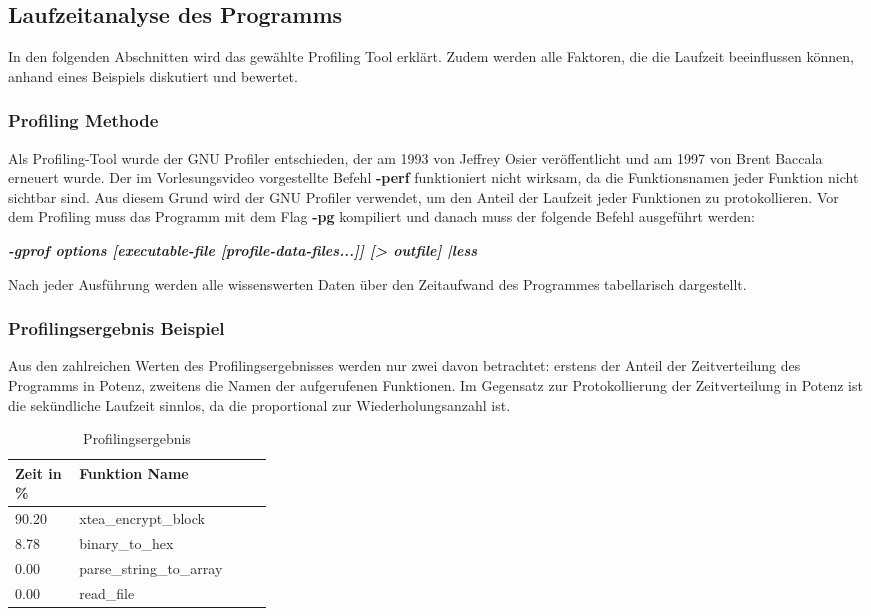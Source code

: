 \documentclass[course=erap]{aspdoc}
\begin{document}
\subsection{Laufzeitanalyse des Programms}
In den folgenden Abschnitten wird das gewählte Profiling Tool erklärt. Zudem werden alle Faktoren, die die Laufzeit beeinflussen können, anhand eines Beispiels diskutiert und bewertet.

\subsubsection{Profiling Methode}
Als Profiling-Tool wurde der GNU Profiler \cite{gnu_profilier} entschieden, der am 1993 von Jeffrey Osier veröffentlicht und am 1997 von Brent Baccala erneuert wurde. Der im Vorlesungsvideo vorgestellte Befehl \textbf{-perf}  funktioniert nicht wirksam, da die Funktionsnamen jeder Funktion nicht sichtbar sind. 
Aus diesem Grund wird der GNU Profiler verwendet, um den Anteil der Laufzeit jeder Funktionen zu protokollieren. Vor dem Profiling muss das Programm mit dem Flag \textbf{-pg} kompiliert und danach muss der folgende Befehl ausgeführt werden:

\begin{center}
        \textbf{\textit{-gprof options [executable-file [profile-data-files...]] [> outfile] |less}} 
\end{center}

Nach jeder Ausführung werden alle wissenswerten Daten über den Zeitaufwand des Programmes tabellarisch dargestellt.

\subsubsection{Profilingsergebnis Beispiel}
Aus den zahlreichen Werten des Profilingsergebnisses werden nur zwei davon betrachtet: erstens der Anteil der Zeitverteilung des Programms in Potenz, zweitens die Namen der aufgerufenen Funktionen. Im Gegensatz zur Protokollierung der Zeitverteilung in Potenz ist die sekündliche Laufzeit sinnlos, da die proportional zur Wiederholungsanzahl ist.

\begin{table}[h]
    \centering
    \footnotesize 
    \begin{tabular}{p{0.1\linewidth}p{0.2\linewidth}}
    \toprule[2pt]
         Zeit in \% & Funktion Name\\
        \midrule
         90.20 & xtea\_encrypt\_block\\
         8.78 & binary\_to\_hex\\
         0.00 & parse\_string\_to\_array\\
         0.00 & read\_file\\
    \bottomrule[2pt]
    \end{tabular}
    \caption{Profilingsergebnis}
    \label{tab:profiling_ergebnis}
\end{table}
\end{document}
